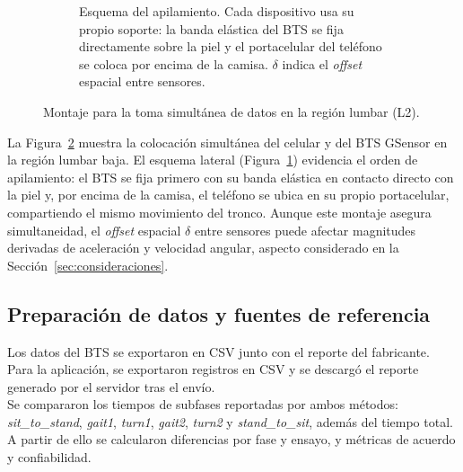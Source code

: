 \documentclass[12pt]{report}
\begin{document}
\begin{justify}
\begin{figure}[H]
\begin{subfigure}[b]{0.40\textwidth}
            \caption{Esquema del apilamiento. Cada dispositivo usa su propio soporte: la banda elástica del BTS se fija directamente sobre la piel y el portacelular del teléfono se coloca por encima de la camisa. $\delta$ indica el \textit{offset} espacial entre sensores.}
            \label{fig:Phone_position_autoTug_esquema}
        \end{subfigure}
        \caption{Montaje para la toma simultánea de datos en la región lumbar (L2).}
        \label{fig:Phone_position_autoTug}
    \end{figure}

    La Figura~\ref{fig:Phone_position_autoTug} muestra la colocación simultánea del celular y del BTS GSensor en la región lumbar baja. El esquema lateral (Figura~\ref{fig:Phone_position_autoTug_esquema}) evidencia el orden de apilamiento: el BTS se fija primero con su banda elástica en contacto directo con la piel y, por encima de la camisa, el teléfono se ubica en su propio portacelular, compartiendo el mismo movimiento del tronco. Aunque este montaje asegura simultaneidad, el \textit{offset} espacial $\delta$ entre sensores puede afectar magnitudes derivadas de aceleración y velocidad angular, aspecto considerado en la Sección~\ref{sec:consideraciones}.\\


    \subsection{Preparación de datos y fuentes de referencia}
    \label{subsec:preparacion-datos}

    Los datos del BTS se exportaron en CSV junto con el reporte del fabricante. Para la aplicación, se exportaron registros en CSV y se descargó el reporte generado por el servidor tras el envío.\\

    Se compararon los tiempos de subfases reportadas por ambos métodos: \textit{sit\_to\_stand}, \textit{gait1}, \textit{turn1}, \textit{gait2}, \textit{turn2} y \textit{stand\_to\_sit}, además del tiempo total. A partir de ello se calcularon diferencias por fase y ensayo, y métricas de acuerdo y confiabilidad.\\




\end{justify}
\end{document}
